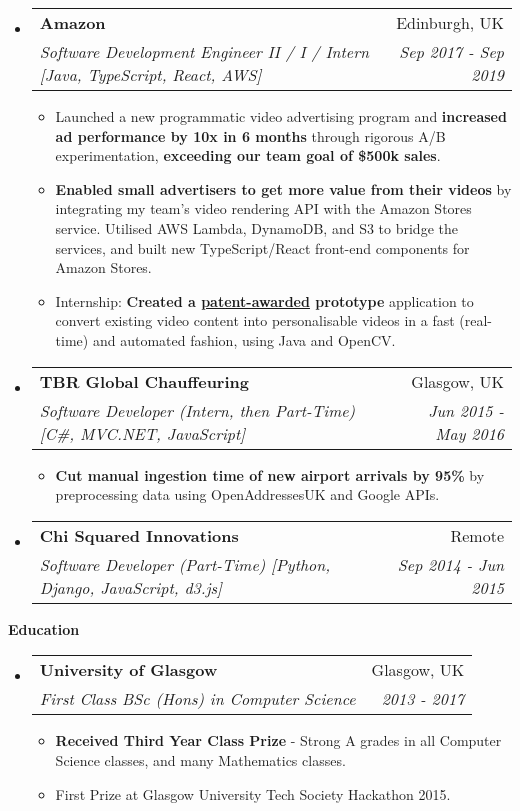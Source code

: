 \documentclass[letterpaper,11pt]{article}
\makeatletter
\newcommand{\resitem}[1]{\item #1 \vspace{-1pt}}
\newcommand{\resheading}[1]{{\large \colorbox{mygrey}{\begin{minipage}{\textwidth}{\textbf{#1 \vphantom{p\^{E}}}}\end{minipage}}}}
\newcommand{\ressubheading}[4]{
\begin{tabular*}{7.0in}{l@{\extracolsep{\fill}}r}
	\textbf{#1} & #2 \\
	\textit{#3} & \textit{#4} \\
\end{tabular*}\vspace{-6pt}}
\makeatother
\begin{document}
\begin{itemize}
	\item
	\ressubheading{Amazon}{Edinburgh, UK}{Software Development Engineer II / I / Intern [Java, TypeScript, React, AWS]}{Sep 2017 - Sep 2019}
	\begin{itemize}
		\resitem{Launched a new programmatic video advertising program and \textbf{increased ad performance by 10x in 6 months} through rigorous A/B experimentation, \textbf{exceeding our team goal of \$500k sales}.}
		\resitem{\textbf{Enabled small advertisers to get more value from their videos} by integrating my team's video rendering API with the Amazon Stores service. Utilised AWS Lambda, DynamoDB, and S3 to bridge the services, and built new TypeScript/React front-end components for Amazon Stores.}
		\resitem{Internship: \textbf{Created a \href{https://pdfpiw.uspto.gov/.piw?PageNum=0&docid=10297026&IDKey=E3B5AD2132FF&HomeUrl=\%2F\%2Fpatft.uspto.gov\%2Fnetahtml\%2FPTO\%2Fpatimg.htm}{patent-awarded} prototype} application to convert existing video content into personalisable videos in a fast (real-time)
		and automated fashion, using Java and OpenCV.}
	\end{itemize}

	\item
	\ressubheading{TBR Global Chauffeuring}{Glasgow, UK}{Software Developer (Intern, then Part-Time) [C\#, MVC.NET, JavaScript]}{Jun 2015 - May 2016}
	\begin{itemize}
		\resitem{\textbf{Cut manual ingestion time of new airport arrivals by 95\%} by preprocessing data using OpenAddressesUK and Google APIs.}
	\end{itemize}

	\item
	\ressubheading{Chi Squared Innovations}{Remote}{Software Developer (Part-Time) [Python, Django, JavaScript, d3.js]}{Sep 2014 - Jun 2015}

\end{itemize}

\pagebreak

\resheading{Education}
\begin{itemize}
	\item
	\ressubheading{University of Glasgow}{Glasgow, UK}{First Class BSc (Hons) in Computer Science}{2013 - 2017}
	\begin{itemize}
		\resitem{\textbf{Received Third Year Class Prize} - Strong A grades in all Computer Science classes, and many Mathematics classes.}
		\resitem{First Prize at Glasgow University Tech Society Hackathon 2015.}
	\end{itemize}
\end{itemize}
\end{document}
